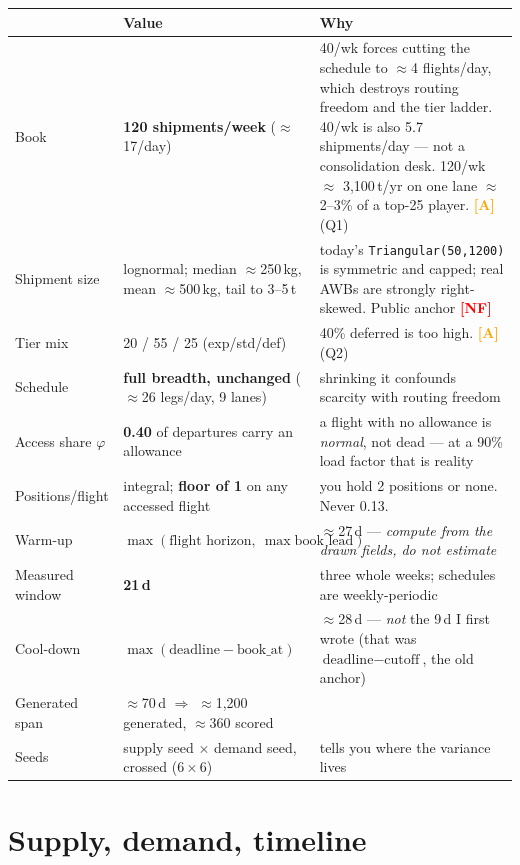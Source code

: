 \documentclass[11pt,a4paper]{article}
\newcommand{\src}[1]{\texttt{\small #1}}
\newcommand{\tagA}{\textcolor{orange}{\textbf{[A]}}}
\newcommand{\tagNF}{\textcolor{red}{\textbf{[NF]}}}
\begin{document}
\begin{center}
\begin{tabularx}{\textwidth}{@{}llL@{}}
\toprule
& \textbf{Value} & \textbf{Why} \\
\midrule
Book & \textbf{120 shipments/week} ($\approx$17/day) &
40/wk forces cutting the schedule to $\approx$4 flights/day, which destroys routing freedom and the tier
ladder. 40/wk is also 5.7 shipments/day --- not a consolidation desk. 120/wk $\approx$ 3{,}100\,t/yr on one
lane $\approx$ 2--3\% of a top-25 player. \tagA{} (Q1) \\[2pt]
Shipment size & lognormal; median $\approx$250\,kg, mean $\approx$500\,kg, tail to 3--5\,t &
today's \src{Triangular(50,1200)} is symmetric and capped; real AWBs are strongly right-skewed. Public
anchor \tagNF \\[2pt]
Tier mix & 20 / 55 / 25 (exp/std/def) & 40\% deferred is too high. \tagA{} (Q2) \\[2pt]
Schedule & \textbf{full breadth, unchanged} ($\approx$26 legs/day, 9 lanes) & shrinking it confounds
scarcity with routing freedom \\[2pt]
Access share $\varphi$ & \textbf{0.40} of departures carry an allowance & a flight with no allowance is
\emph{normal}, not dead --- at a 90\% load factor that is reality \\[2pt]
Positions/flight & integral; \textbf{floor of 1} on any accessed flight & you hold 2 positions or none.
Never 0.13. \\[2pt]
Warm-up & $\max(\text{flight horizon},\ \max \text{book lead})$ & $\approx$27\,d --- \emph{compute from the
drawn fields, do not estimate} \\[2pt]
Measured window & \textbf{21\,d} & three whole weeks; schedules are weekly-periodic \\[2pt]
Cool-down & $\max(\text{deadline} - \text{book\_at})$ & $\approx$28\,d --- \emph{not} the 9\,d I first wrote
(that was $\text{deadline} - \text{cutoff}$, the old anchor) \\[2pt]
Generated span & $\approx$70\,d $\Rightarrow$ $\approx$1{,}200 generated, $\approx$360 scored & \\[2pt]
Seeds & supply seed $\times$ demand seed, crossed ($6\times6$) & tells you where the variance lives \\
\bottomrule
\end{tabularx}
\end{center}

\section{Supply, demand, timeline}
\end{document}
